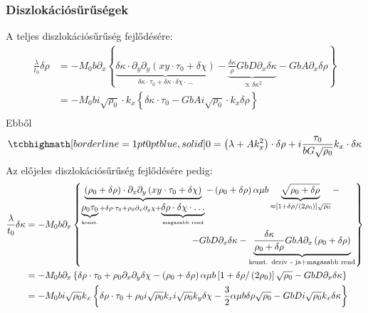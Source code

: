 \documentclass[10pt,a4paper]{scrartcl}
\begin{document}
\subsubsection{Diszlokációsűrűségek}
A teljes diszlokációsűrűség fejlődésére:
\[\begin{aligned}
  \frac{\lambda }{{{t_0}}}\delta \rho  &  =  - {M_0}b{\partial _x}\left\{ {\underbrace {\delta \kappa  \cdot {\partial _y}{\partial _y}\left( {xy \cdot {\tau _0} + \delta \chi } \right)}_{\delta \kappa  \cdot {\tau _0} + \delta \kappa  \cdot \delta \chi  \cdot  \ldots } - \underbrace {\frac{{\delta \kappa }}{\rho }GbD{\partial _x}\delta \kappa }_{ \propto \delta {\kappa ^2}} - GbA{\partial _x}\delta \rho } \right\} \\ 
   &  =  - {M_0}bi\sqrt {{\rho _0}}  \cdot {k_x}\left\{ {\delta \kappa  \cdot {\tau _0} - GbAi\sqrt {{\rho _0}}  \cdot {k_x}\delta \rho } \right\} \\ 
\end{aligned} \]
Ebből 
\begin{equation} \label{eq:lin_ed_rho}
\tcbhighmath[borderline={1pt}{0pt}{blue,solid}]{
0 = \left( {\lambda  + Ak_x^2} \right) \cdot \delta \rho  + i\frac{{{\tau _0}}}{{bG\sqrt {{\rho _0}} }}{k_x} \cdot \delta \kappa }
\end{equation}
Az előjeles diszlokációsűrűség fejlődésére pedig:
\[\begin{aligned}
  \frac{\lambda }{{{t_0}}}\delta\kappa  &  =  - {M_0}b{\partial _x}\left\{ \begin{gathered}
  \underbrace {\left( {{\rho _0} + \delta \rho } \right) \cdot {\partial _x}{\partial _y}\left( {xy \cdot {\tau _0} + \delta \chi } \right)}_{\underbrace {{\rho _0}{\tau _0}}_{{\text{konst}}{\text{.}}} + \delta \rho  \cdot {\tau _0} + {\rho _0}{\partial _x}{\partial _y}\chi  + \underbrace {\delta \rho  \cdot \delta \chi  \cdot  \ldots }_{{\text{magasabb rend}}}} - \left( {{\rho _0} + \delta \rho } \right)\alpha \mu b\underbrace {\sqrt {{\rho _0} + \delta \rho } }_{ \approx \left[ {1 + \delta \rho /\left( {2{\rho _0}} \right)} \right]\sqrt {{\rho _0}} } -  \hfill \\
  \quad \quad \quad \quad \quad \quad \quad \quad \quad \quad \quad \quad  - GbD{\partial _x}\delta\kappa  - \underbrace {\frac{{\delta \kappa }}{{{\rho _0} + \delta \rho }}GbA{\partial _x}\left( {{\rho _0} + \delta \rho } \right)}_{{\text{konst}}{\text{. deriv - ja}} + {\text{magasabb rend}}} \hfill \\ 
\end{gathered}  \right\} \\ 
   &  =  - {M_0}b{\partial _x}\left\{ {\delta \rho  \cdot {\tau _0} + {\rho _0}{\partial _x}{\partial _y}\delta \chi  - \left( {{\rho _0} + \delta \rho } \right)\alpha \mu b\left[ {1 + \delta \rho /\left( {2{\rho _0}} \right)} \right]\sqrt {{\rho _0}}  - GbD{\partial _x}\delta\kappa } \right\} \\ 
   &  =  - {M_0}bi\sqrt {{\rho _0}} {k_x}\left\{ {\delta \rho  \cdot {\tau _0} + {\rho _0}i\sqrt {{\rho _0}} {k_x}i\sqrt {{\rho _0}} {k_y}\delta \chi  - \frac{3}{2}\alpha \mu b\delta \rho \sqrt {{\rho _0}}  - GbDi\sqrt {{\rho _0}} {k_x}\delta\kappa } \right\} \\ 
\end{aligned} \]
\end{document}
